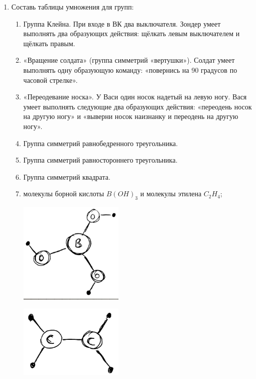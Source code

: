 \documentclass[12pt]{article} %
\begin{document}
\begin{enumerate}[resume]

\item Составь таблицы умножения для групп:

\begin{enumerate}
    \item Группа Клейна. При входе в ВК два выключателя. Зондер умеет выполнять два образующих действия: щёлкать левым выключателем и щёлкать правым.
    \item «Вращение солдата» (группа симметрий «вертушки»). Солдат умеет выполнять одну образующую команду: «повернись на 90 градусов по часовой стрелке».
    \item «Переодевание носка». У Васи один носок надетый на левую ногу. Вася умеет выполнять следующие два образующих действия: «переодень носок на другую ногу» и «выверни носок наизнанку и переодень на другую ногу».
    \item Группа симметрий равнобедренного треугольника.
    \item Группа симметрий равностороннего треугольника.
    \item Группа симметрий квадрата.
    \item молекулы борной кислоты $B(OH)_3$ и молекулы этилена $C_2H_4$;


     \begin{minipage}[c]{0.5\textwidth}
     \centering
             \includegraphics[width=5cm]{figure/boric_acidb.png}
     \end{minipage}
     \begin{minipage}[c]{0.5\textwidth}
     \centering
             \includegraphics[width=5cm]{figure/ethylene.png}
     \end{minipage}


\end{enumerate}
\end{enumerate}
\end{document}
